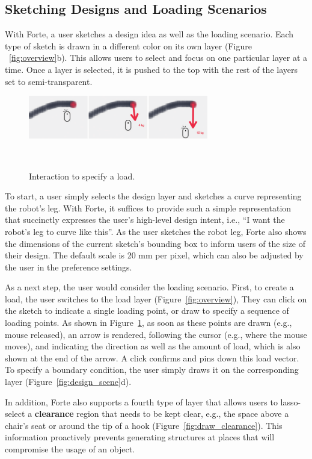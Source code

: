 \subsection{Sketching Designs and Loading Scenarios}
With Forte, a user sketches a design idea as well as the loading scenario. Each type of sketch is drawn in a different color on its own layer (Figure ~\ref{fig:overview}b). This allows users to select and focus on one particular layer at a time. Once a layer is selected, it is pushed to the top with the rest of the layers set to semi-transparent.

\begin{figure} [h]
  \centering
  \includegraphics[width=0.7\textwidth]{figures/draw_load}
  \caption{Interaction to specify a load.}~\label{fig:draw_load}
\end{figure}

To start, a user simply selects the design layer and sketches a curve representing the robot's leg. With Forte, it suffices to provide such a simple representation that succinctly expresses the user's high-level design intent, i.e., ``I want the robot's leg to curve like this''. As the user sketches the robot leg, Forte also shows the dimensions of the current sketch's bounding box to inform users of the size of their design. The default scale is 20 mm per pixel, which can also be adjusted by the user in the preference settings.

As a next step, the user would consider the loading scenario. First, to create a load, the user switches to the load layer (Figure~\ref{fig:overview}), They can click on the sketch to indicate a single loading point, or draw to specify a sequence of loading points. As shown in Figure~\ref{fig:draw_load}, as soon as these points are drawn (e.g., mouse released), an arrow is rendered, following the cursor (e.g., where the mouse moves), and indicating the direction as well as the amount of load, which is also shown at the end of the arrow. A click confirms and pins down this load vector. To specify a boundary condition, the user simply draws it on the corresponding layer (Figure~\ref{fig:design_scene}d).

In addition, Forte also supports a fourth type of layer that allows users to lasso-select a \textbf{clearance} region that needs to be kept clear, e.g., the space above a chair's seat or around the tip of a hook (Figure~\ref{fig:draw_clearance}). This information proactively prevents generating structures at places that will compromise the usage of an object.

